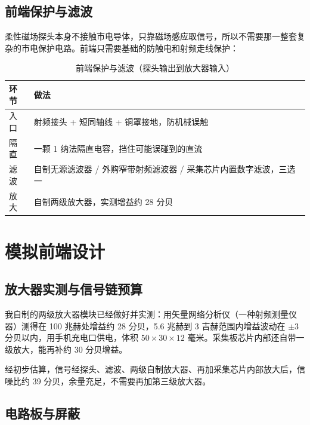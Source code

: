 \documentclass[a4paper,11pt,oneside,UTF8,scheme=plain]{ctexart}
\begin{document}
\subsection{前端保护与滤波}
\label{sec:ch2-protect}

柔性磁场探头本身不接触市电导体，只靠磁场感应取信号，所以不需要那一整套复杂的市电保护电路。前端只需要基础的防触电和射频走线保护：

\begin{table}[H]
\centering
\caption{前端保护与滤波（探头输出到放大器输入）}
\label{tab:protection-chain}
\footnotesize
\begin{tabularx}{\textwidth}{l>{\raggedright\arraybackslash}X}
\toprule
\rowcolor{tableheader}
\textbf{环节} & \textbf{做法} \\
\midrule
入口     & 射频接头 + 短同轴线 + 铜罩接地，防机械误触 \\
隔直     & 一颗 1 纳法隔直电容，挡住可能误碰到的直流 \\
滤波     & 自制无源滤波器 / 外购窄带射频滤波器 / 采集芯片内置数字滤波，三选一 \\
放大     & 自制两级放大器，实测增益约 28 分贝 \\
\bottomrule
\end{tabularx}
\end{table}

\section{模拟前端设计}
\label{sec:ch3}

\subsection{放大器实测与信号链预算}
\label{sec:ch3-arch}

我自制的两级放大器模块已经做好并实测：用矢量网络分析仪（一种射频测量仪器）测得在 100 兆赫处增益约 28 分贝，5.6 兆赫到 3 吉赫范围内增益波动在 \(\pm 3\) 分贝以内，用手机充电口供电，体积 \(50 \times 30 \times 12\) 毫米。采集板芯片内部还自带一级放大，能再补约 30 分贝增益。

经初步估算，信号经探头、滤波、两级自制放大器、再加采集芯片内部放大后，信噪比约 39 分贝，余量充足，不需要再加第三级放大器。

\subsection{电路板与屏蔽}
\label{sec:ch3-pcb}
\end{document}
